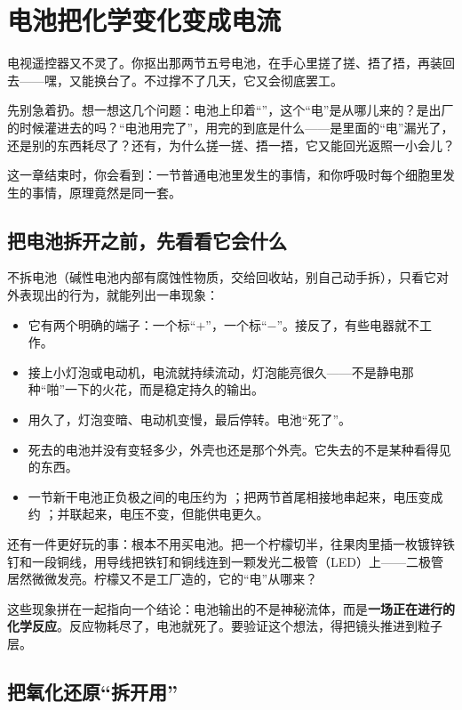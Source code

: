 \chapter{电池把化学变化变成电流}

\begin{kaichang}
电视遥控器又不灵了。你抠出那两节五号电池，在手心里搓了搓、捂了捂，再装回去——嘿，又能换台了。不过撑不了几天，它又会彻底罢工。

先别急着扔。想一想这几个问题：电池上印着“”，这个“电”是从哪儿来的？是出厂的时候灌进去的吗？“电池用完了”，用完的到底是什么——是里面的“电”漏光了，还是别的东西耗尽了？还有，为什么搓一搓、捂一捂，它又能回光返照一小会儿？

这一章结束时，你会看到：一节普通电池里发生的事情，和你呼吸时每个细胞里发生的事情，原理竟然是同一套。
\end{kaichang}

\section{把电池拆开之前，先看看它会什么}

不拆电池（碱性电池内部有腐蚀性物质，交给回收站，别自己动手拆），只看它对外表现出的行为，就能列出一串现象：

\begin{itemize}[itemsep=2pt]
\item 它有两个明确的端子：一个标“$+$”，一个标“$-$”。接反了，有些电器就不工作。
\item 接上小灯泡或电动机，电流就持续流动，灯泡能亮很久——不是静电那种“啪”一下的火花，而是稳定持久的输出。
\item 用久了，灯泡变暗、电动机变慢，最后停转。电池“死了”。
\item 死去的电池并没有变轻多少，外壳也还是那个外壳。它失去的不是某种看得见的东西。
\item 一节新干电池正负极之间的电压约为 ；把两节首尾相接地串起来，电压变成约 ；并联起来，电压不变，但能供电更久。
\end{itemize}

还有一件更好玩的事：根本不用买电池。把一个柠檬切半，往果肉里插一枚镀锌铁钉和一段铜线，用导线把铁钉和铜线连到一颗发光二极管（LED）上——二极管居然微微发亮。柠檬又不是工厂造的，它的“电”从哪来？

这些现象拼在一起指向一个结论：电池输出的不是神秘流体，而是\textbf{一场正在进行的化学反应}。反应物耗尽了，电池就死了。要验证这个想法，得把镜头推进到粒子层。

\section{把氧化还原“拆开用”}

